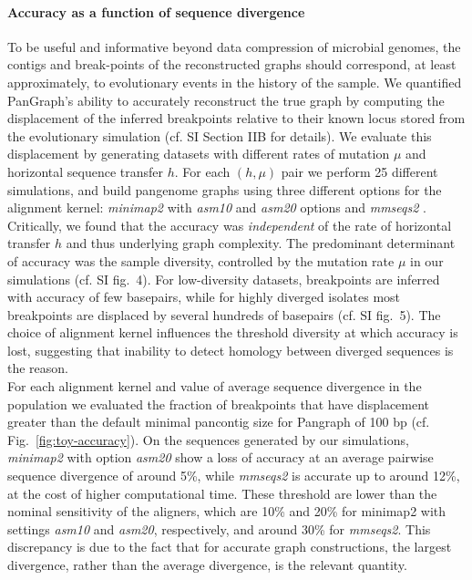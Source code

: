 \documentclass[aps,rmp,preprint,superscriptaddress,10pt,linenumbers]{revtex4-1}
\newcommand{\SIfigMutrate}{4}
\newcommand{\SIfigKernels}{5}
\begin{document}
\paragraph*{Accuracy as a function of sequence divergence}
To be useful and informative beyond data compression of microbial genomes, the contigs and break-points of the reconstructed graphs should correspond, at least approximately, to evolutionary events in the history of the sample.
We quantified PanGraph's ability to accurately reconstruct the true graph by computing the displacement of the inferred breakpoints relative to their known locus stored from the evolutionary simulation (cf. SI Section IIB for details). We evaluate this displacement by generating datasets with different rates of mutation $\mu$ and horizontal sequence transfer $h$. For each $(h,\mu)$ pair we perform 25 different simulations, and build pangenome graphs using three different options for the alignment kernel: \textit{minimap2} \cite{li2018minimap2} with \textit{asm10} and \textit{asm20} options and \textit{mmseqs2} \cite{steinegger2017mmseqs2}.
Critically, we found that the accuracy was \emph{independent} of the rate of horizontal transfer $h$ and thus underlying graph complexity.
The predominant determinant of accuracy was the sample diversity, controlled by the mutation rate $\mu$ in our simulations (cf. SI fig.~\SIfigMutrate). For low-diversity datasets, breakpoints are inferred with accuracy of few basepairs, while for highly diverged isolates most breakpoints are displaced by several hundreds of basepairs (cf. SI fig.~\SIfigKernels). The choice of alignment kernel influences the threshold diversity at which accuracy is lost, suggesting that inability to detect homology between diverged sequences is the reason.\\
For each alignment kernel and value of average sequence divergence in the population we evaluated the fraction of breakpoints that have displacement greater than the default minimal pancontig size for Pangraph of 100 bp (cf. Fig.~\ref{fig:toy-accuracy}). On the sequences generated by our simulations, \textit{minimap2} with option \textit{asm20} show a loss of accuracy at an average pairwise sequence divergence of around 5\%, while \textit{mmseqs2} is accurate up to around 12\%, at the cost of higher computational time.
These threshold are lower than the nominal sensitivity of the aligners, which are 10\% and 20\% for minimap2 with settings \textit{asm10} and \textit{asm20}, respectively, and around 30\% for \textit{mmseqs2}.
This discrepancy is due to the fact that for accurate graph constructions, the largest divergence, rather than the average divergence, is the relevant quantity.
\end{document}
